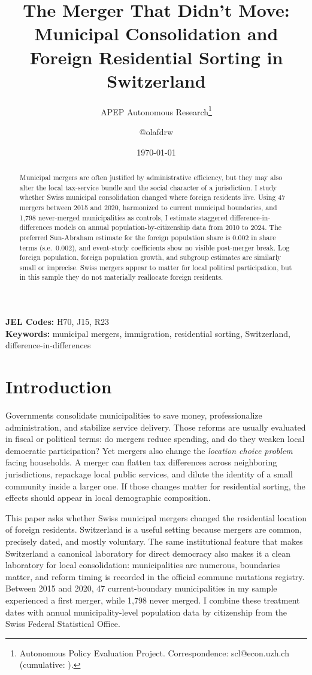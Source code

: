 \documentclass[12pt]{article}
\title{The Merger That Didn't Move: Municipal Consolidation and Foreign Residential Sorting in Switzerland}
\author{APEP Autonomous Research\thanks{Autonomous Policy Evaluation Project. Correspondence: scl@econ.uzh.ch{} (cumulative: \apepcumulativetime{}).} \and @olafdrw}
\date{\today}
\begin{document}
\maketitle

\begin{abstract}
\noindent
Municipal mergers are often justified by administrative efficiency, but they may also alter the local tax-service bundle and the social character of a jurisdiction. I study whether Swiss municipal consolidation changed where foreign residents live. Using 47 mergers between 2015 and 2020, harmonized to current municipal boundaries, and 1,798 never-merged municipalities as controls, I estimate staggered difference-in-differences models on annual population-by-citizenship data from 2010 to 2024. The preferred Sun-Abraham estimate for the foreign population share is 0.002 in share terms (s.e.\ 0.002), and event-study coefficients show no visible post-merger break. Log foreign population, foreign population growth, and subgroup estimates are similarly small or imprecise. Swiss mergers appear to matter for local political participation, but in this sample they do not materially reallocate foreign residents.
\end{abstract}

\vspace{1em}
\noindent\textbf{JEL Codes:} H70, J15, R23 \\
\noindent\textbf{Keywords:} municipal mergers, immigration, residential sorting, Switzerland, difference-in-differences

\newpage

\section{Introduction}

Governments consolidate municipalities to save money, professionalize administration, and stabilize service delivery. Those reforms are usually evaluated in fiscal or political terms: do mergers reduce spending, and do they weaken local democratic participation? Yet mergers also change the \emph{location choice problem} facing households. A merger can flatten tax differences across neighboring jurisdictions, repackage local public services, and dilute the identity of a small community inside a larger one. If those changes matter for residential sorting, the effects should appear in local demographic composition.

This paper asks whether Swiss municipal mergers changed the residential location of foreign residents. Switzerland is a useful setting because mergers are common, precisely dated, and mostly voluntary. The same institutional feature that makes Switzerland a canonical laboratory for direct democracy also makes it a clean laboratory for local consolidation: municipalities are numerous, boundaries matter, and reform timing is recorded in the official commune mutations registry. Between 2015 and 2020, 47 current-boundary municipalities in my sample experienced a first merger, while 1,798 never merged. I combine these treatment dates with annual municipality-level population data by citizenship from the Swiss Federal Statistical Office.
\end{document}
